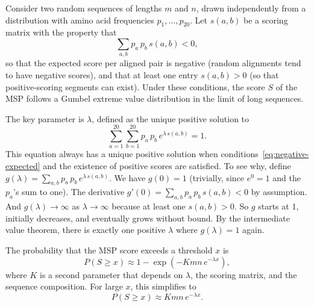 Consider two random sequences of lengths $m$ and $n$, drawn independently from a distribution with amino acid frequencies $p_1, \ldots, p_{20}$. Let $s(a,b)$ be a scoring matrix with the property that
\begin{equation}
  \label{eq:negative-expected}
  \sum_{a,b} p_a \, p_b \, s(a,b) < 0,
\end{equation}
so that the expected score per aligned pair is negative (random alignments tend to have negative scores), and that at least one entry $s(a,b) > 0$ (so that positive-scoring segments can exist). Under these conditions, the score $S$ of the MSP follows a Gumbel extreme value distribution in the limit of long sequences.

The key parameter is $\lambda$, defined as the unique positive solution to
\begin{equation}
  \label{eq:karlin-lambda}
  \sum_{a=1}^{20} \sum_{b=1}^{20} p_a \, p_b \, e^{\lambda \, s(a,b)} = 1.
\end{equation}
This equation always has a unique positive solution when conditions~\eqref{eq:negative-expected} and the existence of positive scores are satisfied. To see why, define $g(\lambda) = \sum_{a,b} p_a \, p_b \, e^{\lambda \, s(a,b)}$. We have $g(0) = 1$ (trivially, since $e^0 = 1$ and the $p_a$'s sum to one). The derivative $g'(0) = \sum_{a,b} p_a \, p_b \, s(a,b) < 0$ by assumption. And $g(\lambda) \to \infty$ as $\lambda \to \infty$ because at least one $s(a,b) > 0$. So $g$ starts at 1, initially decreases, and eventually grows without bound. By the intermediate value theorem, there is exactly one positive $\lambda$ where $g(\lambda) = 1$ again.

The probability that the MSP score exceeds a threshold $x$ is
\begin{equation}
  \label{eq:gumbel}
  P(S \geq x) \approx 1 - \exp\!\left(-K m n \, e^{-\lambda x}\right),
\end{equation}
where $K$ is a second parameter that depends on $\lambda$, the scoring matrix, and the sequence composition. For large $x$, this simplifies to
\begin{equation}
  \label{eq:gumbel-approx}
  P(S \geq x) \approx K m n \, e^{-\lambda x}.
\end{equation}

